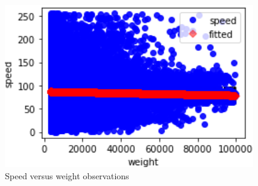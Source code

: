 \documentclass[10pt,conference,compsocconf]{IEEEtran}
\begin{document}
\begin{figure}[h!]
    \centering
    \includegraphics[scale=1.2]{report/img/speed-weight-corr.PNG}
    \caption{Speed versus weight observations}
    \label{speed-weight-corr}
\end{figure}

\makeatletter
\setlength{\@fptop}{25pt}
\makeatother
\end{document}
